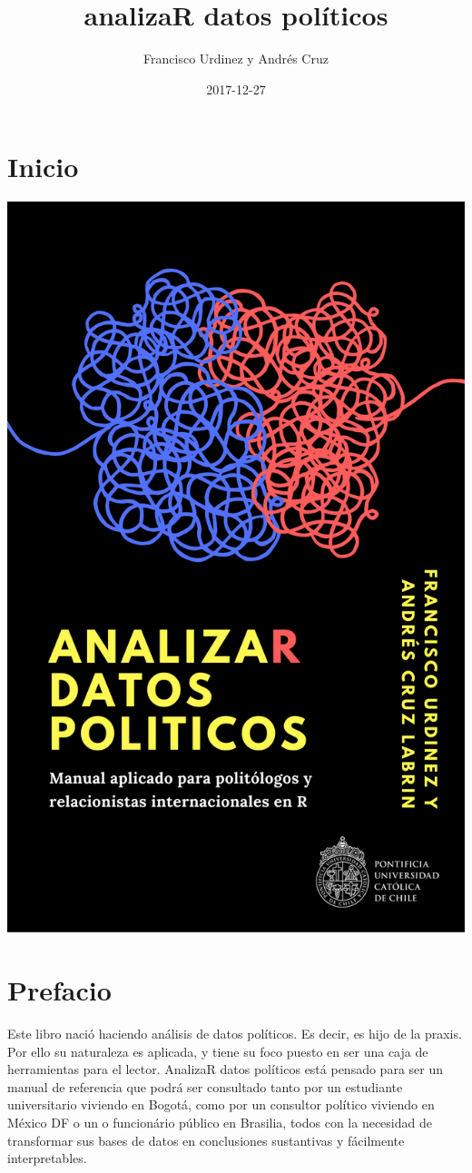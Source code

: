 \documentclass[]{book}
\title{analizaR datos políticos}
\author{Francisco Urdinez y Andrés Cruz}
\date{2017-12-27}
\begin{document}
\maketitle

{
\setcounter{tocdepth}{1}
\tableofcontents
}
\chapter*{Inicio}\label{inicio}

\begin{center}\includegraphics[width=0.6\linewidth]{00-images/tapa} \end{center}

\chapter{Prefacio}\label{prefacio}

Este libro nació haciendo análisis de datos políticos. Es decir, es hijo
de la praxis. Por ello su naturaleza es aplicada, y tiene su foco puesto
en ser una caja de herramientas para el lector. AnalizaR datos políticos
está pensado para ser un manual de referencia que podrá ser consultado
tanto por un estudiante universitario viviendo en Bogotá, como por un
consultor político viviendo en México DF o un o funcionário público en
Brasilia, todos con la necesidad de transformar sus bases de datos en
conclusiones sustantivas y fácilmente interpretables.
\end{document}
